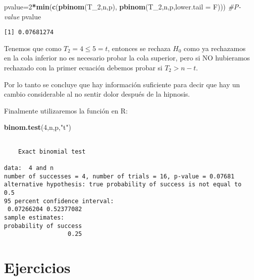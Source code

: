 \documentclass[
  a4paper,
  oneside,
  openany]{book}
\newenvironment{Shaded}{\begin{snugshade}}{\end{snugshade}}
\newcommand{\AttributeTok}[1]{\textcolor[rgb]{0.13,0.29,0.53}{#1}}
\newcommand{\CommentTok}[1]{\textcolor[rgb]{0.56,0.35,0.01}{\textit{#1}}}
\newcommand{\DecValTok}[1]{\textcolor[rgb]{0.00,0.00,0.81}{#1}}
\newcommand{\FunctionTok}[1]{\textcolor[rgb]{0.13,0.29,0.53}{\textbf{#1}}}
\newcommand{\NormalTok}[1]{#1}
\newcommand{\OtherTok}[1]{\textcolor[rgb]{0.56,0.35,0.01}{#1}}
\newcommand{\SpecialCharTok}[1]{\textcolor[rgb]{0.81,0.36,0.00}{\textbf{#1}}}
\newcommand{\StringTok}[1]{\textcolor[rgb]{0.31,0.60,0.02}{#1}}
\begin{document}
\begin{Shaded}
\begin{Highlighting}[]
\NormalTok{pvalue}\OtherTok{=}\DecValTok{2}\SpecialCharTok{*}\FunctionTok{min}\NormalTok{(}\FunctionTok{c}\NormalTok{(}\FunctionTok{pbinom}\NormalTok{(T\_2,n,p), }\FunctionTok{pbinom}\NormalTok{(T\_2,n,p,}\AttributeTok{lower.tail =}\NormalTok{ F)))   }\CommentTok{\#P{-}value}
\NormalTok{pvalue}
\end{Highlighting}
\end{Shaded}

\begin{verbatim}
[1] 0.07681274
\end{verbatim}

Tenemos que como \(T_2=4\leq 5 =t\), entonces se rechaza \(H_0\) como ya rechazamos en la cola inferior no es necesario probar la cola superior, pero si NO hubieramos rechazado con la primer ecuación debemos probar si \(T_2>n-t\).

Por lo tanto se concluye que hay información suficiente para decir que hay un cambio considerable al no sentir dolor después de la hipnosis.

Finalmente utilizaremos la función en R:

\begin{Shaded}
\begin{Highlighting}[]
\FunctionTok{binom.test}\NormalTok{(}\DecValTok{4}\NormalTok{,n,p,}\StringTok{"t"}\NormalTok{)}
\end{Highlighting}
\end{Shaded}

\begin{verbatim}

    Exact binomial test

data:  4 and n
number of successes = 4, number of trials = 16, p-value = 0.07681
alternative hypothesis: true probability of success is not equal to 0.5
95 percent confidence interval:
 0.07266204 0.52377082
sample estimates:
probability of success 
                  0.25 
\end{verbatim}

\break

\hypertarget{ejercicios-3}{%
\section{Ejercicios}\label{ejercicios-3}}
\end{document}
